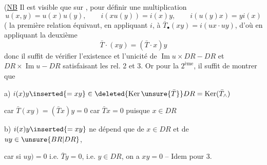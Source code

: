 (\uline{NB} Il est visible que sur  , pour définir
 une multiplication
\[
u(x,y)=u(x)u(y),\qquad i(xu(y))=i(x)y,\qquad i(u(y)x)=yi(x)
\]
( la première relation équivaut, en appliquant $i$, à
$\bar T_\bullet(xy)=i(ux\cdot uy)$, d'où en appliquant la deuxième
\[
\bar T\cdot(xy)=(\bar T\cdot x)y
\]
donc il suffit de vérifier l'existence et l'unicité de
$\operatorname{Im}u\times DR-DR$ et $DR\times\operatorname{Im}u-DR$
satisfaisant les rel. 2 et 3. Or pour la $2^{\text{ème}}$, il suffit de montrer que

a) $i(x)y\inserted{=xy}\in\deleted{\operatorname{Ker}\unsure{\bar T}}DR=\operatorname{Ker}(\bar T_\wedge)$

car $\bar T(xy)=(\bar T x)y=0$ car $\bar T x=0$ puisque $x\in DR$

b) $i(x)y\inserted{=xy}$ ne dépend que de $x\in DR$ et de $uy\in\unsure{BR|DR}$,

car si $uy)=0$ i.e. $\bar T y=0$, i.e. $y\in DR$, on a
$xy=0$ -- Idem pour 3.
